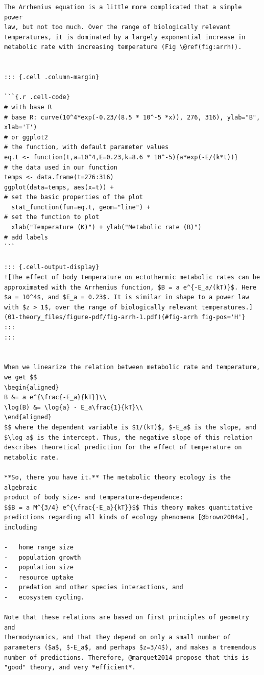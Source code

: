 \documentclass[
  10pt,
  letterpaper,
  nols]{tufte-book}
\begin{document}
\begin{verbatim}
The Arrhenius equation is a little more complicated that a simple power
law, but not too much. Over the range of biologically relevant
temperatures, it is dominated by a largely exponential increase in
metabolic rate with increasing temperature (Fig \@ref(fig:arrh)).


::: {.cell .column-margin}

```{.r .cell-code}
# with base R
# base R: curve(10^4*exp(-0.23/(8.5 * 10^-5 *x)), 276, 316), ylab="B", xlab='T')
# or ggplot2
# the function, with default parameter values
eq.t <- function(t,a=10^4,E=0.23,k=8.6 * 10^-5){a*exp(-E/(k*t))}
# the data used in our function
temps <- data.frame(t=276:316)
ggplot(data=temps, aes(x=t)) + 
# set the basic properties of the plot
  stat_function(fun=eq.t, geom="line") + 
# set the function to plot
  xlab("Temperature (K)") + ylab("Metabolic rate (B)")  
# add labels
```

::: {.cell-output-display}
![The effect of body temperature on ectothermic metabolic rates can be approximated with the Arrhenius function, $B = a e^{-E_a/(kT)}$. Here $a = 10^4$, and $E_a = 0.23$. It is similar in shape to a power law with $z > 1$, over the range of biologically relevant temperatures.](01-theory_files/figure-pdf/fig-arrh-1.pdf){#fig-arrh fig-pos='H'}
:::
:::


When we linearize the relation between metabolic rate and temperature,
we get $$
\begin{aligned}
B &= a e^{\frac{-E_a}{kT}}\\
\log(B) &= \log{a} - E_a\frac{1}{kT}\\
\end{aligned}
$$ where the dependent variable is $1/(kT)$, $-E_a$ is the slope, and
$\log a$ is the intercept. Thus, the negative slope of this relation
describes theoretical prediction for the effect of temperature on
metabolic rate.

**So, there you have it.** The metabolic theory ecology is the algebraic
product of body size- and temperature-dependence:
$$B = a M^{3/4} e^{\frac{-E_a}{kT}}$$ This theory makes quantitative
predictions regarding all kinds of ecology phenomena [@brown2004a],
including

-   home range size
-   population growth
-   population size
-   resource uptake
-   predation and other species interactions, and
-   ecosystem cycling.

Note that these relations are based on first principles of geometry and
thermodynamics, and that they depend on only a small number of
parameters ($a$, $-E_a$, and perhaps $z=3/4$), and makes a tremendous
number of predictions. Therefore, @marquet2014 propose that this is
"good" theory, and very *efficient*.


\end{verbatim}
\end{document}
